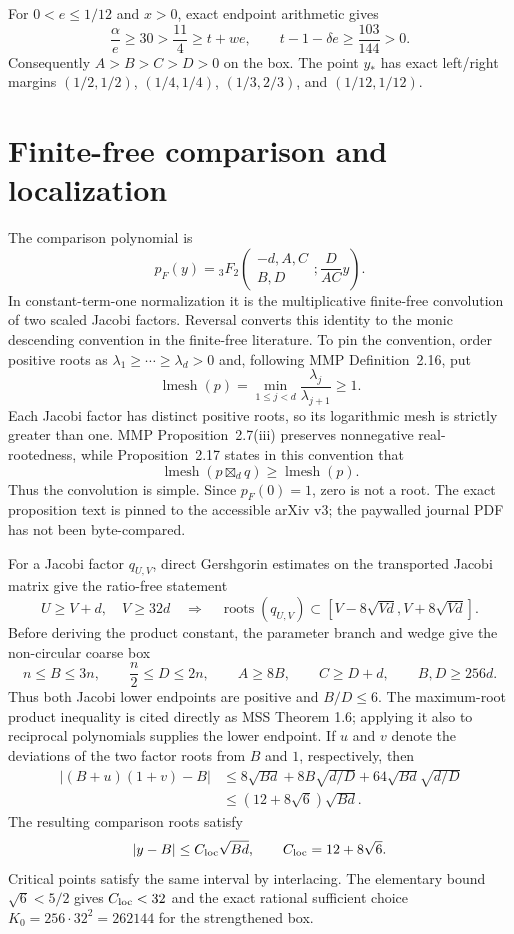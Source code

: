 \documentclass[11pt]{article}
\theoremstyle{definition}
\theoremstyle{remark}
\begin{document}
For $0<e\le1/12$ and $x>0$, exact endpoint arithmetic gives
\[
 \frac{\alpha}{e}\ge30>\frac{11}{4}\ge t+we,\qquad
 t-1-\delta e\ge\frac{103}{144}>0.
\]
Consequently $A>B>C>D>0$ on the box.  The point $y_*$ has exact left/right
margins $(1/2,1/2)$, $(1/4,1/4)$, $(1/3,2/3)$, and $(1/12,1/12)$.

\section{Finite-free comparison and localization}\label{sec:finitefree}

The comparison polynomial is
\[
 p_F(y)={}_3F_2\!\left(
 \begin{matrix}-d,A,C\\B,D\end{matrix};\frac{D}{AC}y\right).
\]
In constant-term-one normalization it is the multiplicative finite-free
convolution of two scaled Jacobi factors.  Reversal converts this identity to
the monic descending convention in the finite-free literature.  To pin the
convention, order positive roots as
$\lambda_1\ge\cdots\ge\lambda_d>0$ and, following MMP Definition~2.16, put
\[
 \operatorname{lmesh}(p)=
 \min_{1\le j<d}\frac{\lambda_j}{\lambda_{j+1}}\ge1.
\]
Each Jacobi factor has distinct positive roots, so its logarithmic mesh is
strictly greater than one.  MMP Proposition~2.7(iii) preserves nonnegative
real-rootedness, while Proposition~2.17 states in this convention that
\[
 \operatorname{lmesh}(p\boxtimes_dq)
 \ge \operatorname{lmesh}(p).
\]
Thus the convolution is simple.  Since $p_F(0)=1$, zero is not a root.  The
exact proposition text is pinned to the accessible arXiv v3; the paywalled
journal PDF has not been byte-compared.

For a Jacobi factor $q_{U,V}$, direct Gershgorin estimates on the transported
Jacobi matrix give the ratio-free statement
\[
 U\ge V+d,\quad V\ge32d
 \quad\Longrightarrow\quad
 \operatorname{roots}(q_{U,V})\subset
 [V-8\sqrt{Vd},V+8\sqrt{Vd}].
\]
Before deriving the product constant, the parameter branch and wedge give
the non-circular coarse box
\[
 n\le B\le3n,\qquad \frac n2\le D\le2n,
 \qquad A\ge8B,\qquad C\ge D+d,
 \qquad B,D\ge256d.
\]
Thus both Jacobi lower endpoints are positive and $B/D\le6$.  The
maximum-root product inequality is cited directly as MSS Theorem 1.6;
applying it also to reciprocal polynomials supplies the lower endpoint.  If
$u$ and $v$ denote the deviations of the two factor roots from $B$ and $1$,
respectively, then
\begin{align*}
 |(B+u)(1+v)-B|
 &\le8\sqrt{Bd}+8B\sqrt{d/D}
       +64\sqrt{Bd}\sqrt{d/D}\\
 &\le(12+8\sqrt6)\sqrt{Bd}.
\end{align*}
The resulting comparison roots satisfy
\begin{equation}\label{eq:local}
                    |y-B|\le C_{\rm loc}\sqrt{Bd},\qquad
 C_{\rm loc}=12+8\sqrt6.
\end{equation}
Critical points satisfy the same interval by interlacing.  The elementary
bound $\sqrt6<5/2$ gives $C_{\rm loc}<32$ and the exact rational sufficient
choice $K_0=256\cdot32^2=262144$ for the strengthened box.
\end{document}

